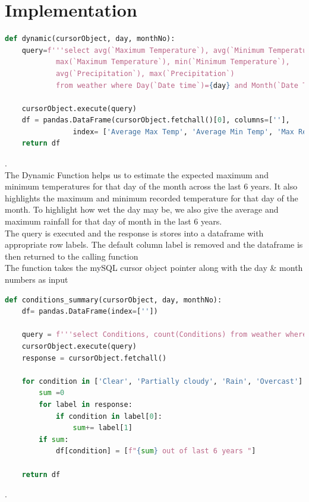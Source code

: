 \documentclass[12pt, a4paper]{article}
\begin{document}
\section{Implementation}
\begin{lstlisting}[language=Python, breaklines=true]
def dynamic(cursorObject, day, monthNo):
    query=f'''select avg(`Maximum Temperature`), avg(`Minimum Temperature`),
            max(`Maximum Temperature`), min(`Minimum Temperature`),
            avg(`Precipitation`), max(`Precipitation`)
            from weather where Day(`Date time`)={day} and Month(`Date Time`)={monthNo};'''

    cursorObject.execute(query)
    df = pandas.DataFrame(cursorObject.fetchall()[0], columns=[''],
                index= ['Average Max Temp', 'Average Min Temp', 'Max Recorded Temp', 'Min Recorded Temp', 'Average Rainfall', 'Max Rainfall'])
    return df
\end{lstlisting}
.\\

The Dynamic Function helps us to estimate the expected maximum and minimum temperatures for that day of the month across the last 6 years. It also highlights the maximum and minimum recorded temperature for that day of the month. To highlight how wet the day may be, we also give the average and maximum rainfall for that day of month in the last 6 years.\\

The query is executed and the response is stores into a dataframe with appropriate row labels. The default column label is removed and the dataframe is then returned to the calling function\\

The function takes the mySQL cursor object pointer along with the day \& month numbers as input
\newpage
\begin{lstlisting}[language=Python, breaklines=true]
def conditions_summary(cursorObject, day, monthNo):
    df= pandas.DataFrame(index=[''])

    query = f'''select Conditions, count(Conditions) from weather where Day(`Date time`)={day} and Month(`Date Time`)={monthNo} group by Conditions'''
    cursorObject.execute(query)
    response = cursorObject.fetchall()

    for condition in ['Clear', 'Partially cloudy', 'Rain', 'Overcast']:
        sum =0
        for label in response:
            if condition in label[0]:
                sum+= label[1]
        if sum:
            df[condition] = [f"{sum} out of last 6 years "]
        
    return df
\end{lstlisting}
.\\
\end{document}
